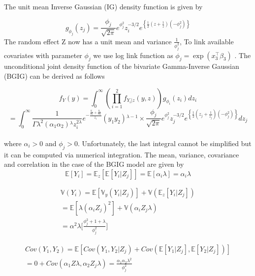 \documentclass[12pt]{article}%
\theoremstyle{definition}
\theoremstyle{remark}
\begin{document}
The unit mean Inverse Gaussian (IG) density function is given by 

\begin{equation}
	g_{\phi_j}(z_j) =\frac{\phi_j }{\sqrt{2 \pi }}e^{\phi_j ^2}z_i^{-3/2}e^{\left\{\frac{1}{2} \left(z+\frac{1}{z}\right) \left(-\phi_j ^2\right)\right\}}
\end{equation}
The random effect Z now has a unit mean and variance $ \frac{1}{\phi_j ^2}$, To link available covariates with parameter $\phi_j$ we use log link function as $\phi_j = \exp(x_3^\top \beta_3)$
.  The unconditional joint 
density function of the bivariate Gamma-Inverse Gaussian (BGIG) can be derived as 
follows

\begin{equation*}
		f_Y(y)= \int _0^{\infty }(\prod _{i=1}^2 f_{Y_{i}|z}(y,z))g_{\phi_{i}}(z_i) dz_i
\end{equation*}
\begin{equation*}
	=\int _0^{\infty }\frac{1}{\Gamma \lambda ^2 \left(\alpha _1 \alpha _2\right){}^{\lambda } z_i^{2 \lambda }}e^{-\frac{\frac{y_1}{\alpha _1}+\frac{y_2}{\alpha _2}}{z_i}}\left(y_1 y_2\right){}^{\lambda -1} \times \frac{\phi_j }{\sqrt{2 \pi }}e^{\phi_j ^2}z_j^{-3/2}e^{\left\{\frac{1}{2} \left(z_j+\frac{1}{z_j}\right) \left(-\phi_j ^2\right)\right\}} dz_j
\end{equation*}\\
where $\alpha_i > 0$ and $\phi_j > 0$. Unfortunately, the last integral cannot be simplified but it can be computed via numerical integration.
The mean, variance, covariance and correlation in the case of the BGIG model are given by
\begin{equation}
	\mathbb{E}[Y_i]=\mathbb{E}_z[\mathbb{E}[Y_i|Z_j]]=\mathbb{E}[\alpha_{i}\lambda]=\alpha_{i}\lambda
\end{equation}

\begin{align} \nonumber \label{var}
		\mathbb{V}(Y_i)=\mathbb{E}[\mathbb{V}_y(Y_i|Z_j)]+\mathbb{V}(\mathbb{E}_z[Y_i|Z_j])\\
		=\mathbb{E}[\lambda(\alpha_{i}Z_j)^2]+\mathbb{V}(\alpha_{i}Z_j\lambda)\\
		=\alpha^2\lambda\bigg[\frac{\phi_j^2+1+\lambda}{\phi_j^2}\bigg]
\end{align}

\begin{align}\nonumber \label{var}
	Cov(Y_1,Y_2)=\mathbb{E}[Cov(Y_1,Y_2|Z_j)+Cov(\mathbb{E}[Y_1|Z_j],\mathbb{E}[Y_2|Z_j])]\\
	=0+Cov(\alpha_{1}Z\lambda,\alpha_{2}Z_j\lambda)=\frac{\alpha_{1}\alpha_{2}\lambda^2}{\phi_j^2  }
\end{align}
\end{document}
